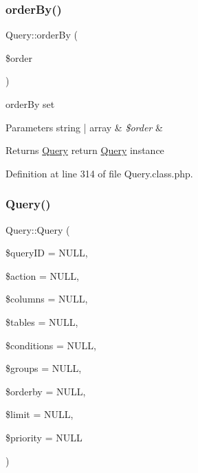 \subsubsection{\texorpdfstring{order\+By()}{orderBy()}}
{\footnotesize\ttfamily Query\+::order\+By (\begin{DoxyParamCaption}\item[{}]{\$order }\end{DoxyParamCaption})}

order\+By set 
\begin{DoxyParams}[1]{Parameters}
string | array & {\em \$order} & \\
\hline
\end{DoxyParams}
\begin{DoxyReturn}{Returns}
\hyperlink{classQuery}{Query} return \hyperlink{classQuery}{Query} instance 
\end{DoxyReturn}


Definition at line 314 of file Query.\+class.\+php.

\hypertarget{classQuery_a18345a4b454ee480c261c15c4338768e}{}\label{classQuery_a18345a4b454ee480c261c15c4338768e} 
\subsubsection{\texorpdfstring{Query()}{Query()}}
{\footnotesize\ttfamily Query\+::\+Query (\begin{DoxyParamCaption}\item[{}]{\$query\+ID = {\ttfamily NULL},  }\item[{}]{\$action = {\ttfamily NULL},  }\item[{}]{\$columns = {\ttfamily NULL},  }\item[{}]{\$tables = {\ttfamily NULL},  }\item[{}]{\$conditions = {\ttfamily NULL},  }\item[{}]{\$groups = {\ttfamily NULL},  }\item[{}]{\$orderby = {\ttfamily NULL},  }\item[{}]{\$limit = {\ttfamily NULL},  }\item[{}]{\$priority = {\ttfamily NULL} }\end{DoxyParamCaption})}

